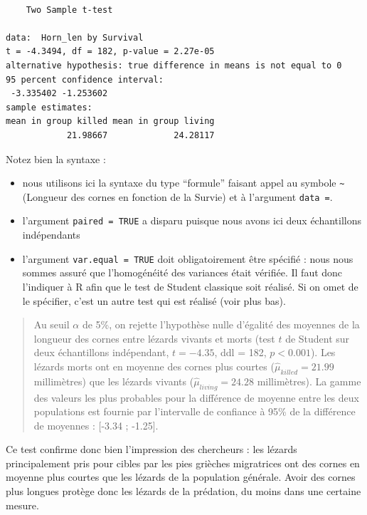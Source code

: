 \documentclass[a4paperpaper,]{article}
\providecommand{\tightlist}{%
  \setlength{\itemsep}{0pt}\setlength{\parskip}{0pt}}
\begin{document}
\begin{verbatim}

    Two Sample t-test

data:  Horn_len by Survival
t = -4.3494, df = 182, p-value = 2.27e-05
alternative hypothesis: true difference in means is not equal to 0
95 percent confidence interval:
 -3.335402 -1.253602
sample estimates:
mean in group killed mean in group living 
            21.98667             24.28117 
\end{verbatim}

Notez bien la syntaxe :

\begin{itemize}
\tightlist
\item
  nous utilisons ici la syntaxe du type ``formule'' faisant appel au symbole \texttt{\textasciitilde{}} (Longueur des cornes en fonction de la Survie) et à l'argument \texttt{data\ =}.
\item
  l'argument \texttt{paired\ =\ TRUE} a disparu puisque nous avons ici deux échantillons indépendants
\item
  l'argument \texttt{var.equal\ =\ TRUE} doit obligatoirement être spécifié : nous nous sommes assuré que l'homogénéité des variances était vérifiée. Il faut donc l'indiquer à R afin que le test de Student classique soit réalisé. Si on omet de le spécifier, c'est un autre test qui est réalisé (voir plus bas).
\end{itemize}

\begin{quote}
Au seuil \(\alpha\) de 5\%, on rejette l'hypothèse nulle d'égalité des moyennes de la longueur des cornes entre lézards vivants et morts (test \(t\) de Student sur deux échantillons indépendant, \(t = -4.35\), ddl = 182, \(p < 0.001\)). Les lézards morts ont en moyenne des cornes plus courtes (\(\hat{\mu}_{killed} = 21.99\) millimètres) que les lézards vivants (\(\hat{\mu}_{living} = 24.28\) millimètres). La gamme des valeurs les plus probables pour la différence de moyenne entre les deux populations est fournie par l'intervalle de confiance à 95\% de la différence de moyennes : {[}-3.34 ; -1.25{]}.
\end{quote}

Ce test confirme donc bien l'impression des chercheurs : les lézards principalement pris pour cibles par les pies grièches migratrices ont des cornes en moyenne plus courtes que les lézards de la population générale. Avoir des cornes plus longues protège donc les lézards de la prédation, du moins dans une certaine mesure.
\end{document}
